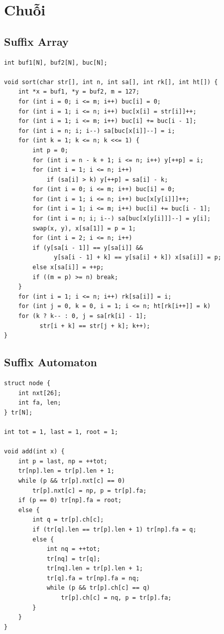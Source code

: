 \documentclass[11pt]{article}
\begin{document}
\section{Chuỗi}

\subsection{Suffix Array}

\begingroup
\footnotesize
\begin{verbatim}
int buf1[N], buf2[N], buc[N];

void sort(char str[], int n, int sa[], int rk[], int ht[]) {
    int *x = buf1, *y = buf2, m = 127;
    for (int i = 0; i <= m; i++) buc[i] = 0;
    for (int i = 1; i <= n; i++) buc[x[i] = str[i]]++;
    for (int i = 1; i <= m; i++) buc[i] += buc[i - 1];
    for (int i = n; i; i--) sa[buc[x[i]]--] = i;
    for (int k = 1; k <= n; k <<= 1) {
        int p = 0;
        for (int i = n - k + 1; i <= n; i++) y[++p] = i;
        for (int i = 1; i <= n; i++)
            if (sa[i] > k) y[++p] = sa[i] - k;
        for (int i = 0; i <= m; i++) buc[i] = 0;
        for (int i = 1; i <= n; i++) buc[x[y[i]]]++;
        for (int i = 1; i <= m; i++) buc[i] += buc[i - 1];
        for (int i = n; i; i--) sa[buc[x[y[i]]]--] = y[i];
        swap(x, y), x[sa[1]] = p = 1;
        for (int i = 2; i <= n; i++)
        if (y[sa[i - 1]] == y[sa[i]] &&
              y[sa[i - 1] + k] == y[sa[i] + k]) x[sa[i]] = p;
        else x[sa[i]] = ++p;
        if ((m = p) >= n) break;
    }
    for (int i = 1; i <= n; i++) rk[sa[i]] = i;
    for (int j = 0, k = 0, i = 1; i <= n; ht[rk[i++]] = k)
    for (k ? k-- : 0, j = sa[rk[i] - 1];
          str[i + k] == str[j + k]; k++);
}
\end{verbatim}
\endgroup

\subsection{Suffix Automaton}

\begingroup
\footnotesize
\begin{verbatim}
struct node {
    int nxt[26];
    int fa, len;
} tr[N];

int tot = 1, last = 1, root = 1;

void add(int x) {
    int p = last, np = ++tot;
    tr[np].len = tr[p].len + 1;
    while (p && tr[p].nxt[c] == 0)
        tr[p].nxt[c] = np, p = tr[p].fa;
    if (p == 0) tr[np].fa = root;
    else {
        int q = tr[p].ch[c];
        if (tr[q].len == tr[p].len + 1) tr[np].fa = q;
        else {
            int nq = ++tot;
            tr[nq] = tr[q];
            tr[nq].len = tr[p].len + 1;
            tr[q].fa = tr[np].fa = nq;
            while (p && tr[p].ch[c] == q)
                tr[p].ch[c] = nq, p = tr[p].fa;
        }
    }
}
\end{verbatim}
\endgroup
\end{document}
